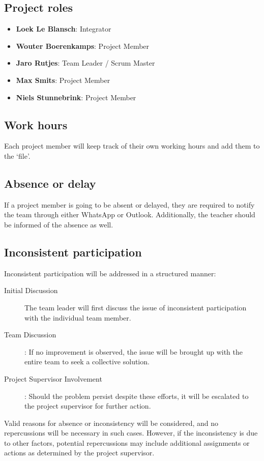 \documentclass{projdoc}
\begin{document}
\subsection{Project roles}
\begin{itemize}
	\item \textbf{Loek Le Blansch}: Integrator
	\item \textbf{Wouter Boerenkamps}: Project Member
	\item \textbf{Jaro Rutjes}: Team Leader / Scrum Master
	\item \textbf{Max Smits}: Project Member
	\item \textbf{Niels Stunnebrink}: Project Member
\end{itemize}


\subsection{Work hours}
Each project member will keep track of their own working hours and 
add them to the `file'.

\subsection{Absence or delay}
If a project member is going to be absent or delayed, they are required to 
notify the team through either WhatsApp or Outlook. Additionally, the teacher 
should be informed of the absence as well.

\subsection{Inconsistent participation}
Inconsistent participation will be addressed in a structured manner:

\begin{description}
	\item[Initial Discussion] The team leader will first discuss the 
	issue of inconsistent participation with the individual team member.
	\item [Team Discussion]: If no improvement is observed, the issue 
	will be brought up with the entire team to seek a collective solution.
	\item [Project Supervisor Involvement]: Should the problem persist 
	despite these efforts, it will be escalated to the project supervisor for 
	further action.
\end{description}

Valid reasons for absence or inconsistency will be considered, and no 
repercussions will be necessary in such cases. However, if the inconsistency is 
due to other factors, potential repercussions may include additional assignments
 or actions as determined by the project supervisor.
 
\end{document}
